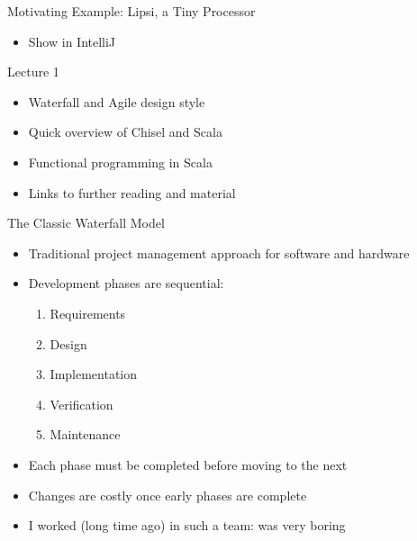 \begin{frame}[fragile]{Motivating Example: Lipsi, a Tiny Processor}
\begin{itemize}
\item Show in IntelliJ
\end{itemize}
\end{frame}

\begin{frame}[fragile]{Lecture 1}
\begin{itemize}
\item Waterfall and Agile design style
\item Quick overview of Chisel and Scala
\item Functional programming in Scala
\item Links to further reading and material
\end{itemize}
\end{frame}


\begin{frame}{The Classic Waterfall Model}
\begin{itemize}
    \item Traditional project management approach for software and hardware
    \item Development phases are sequential:
    \begin{enumerate}
        \item Requirements
        \item Design
        \item Implementation
        \item Verification
        \item Maintenance
    \end{enumerate}
    \item Each phase must be completed before moving to the next
    \item Changes are costly once early phases are complete
    \item I worked (long time ago) in such a team: was very boring
\end{itemize}
\end{frame}

